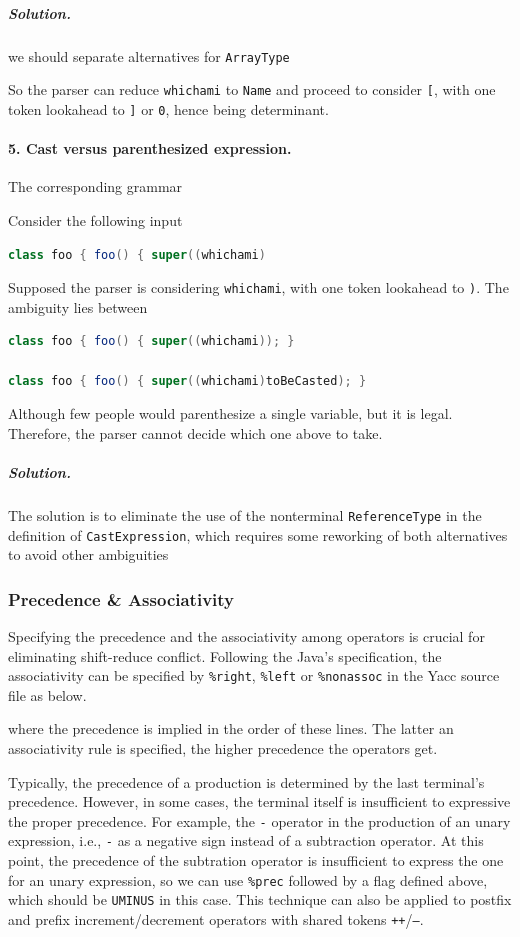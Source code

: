 \documentclass[12pt]{article}
\begin{document}
\subparagraph{Solution.} we should separate alternatives for \texttt{ArrayType}



So the parser can reduce \texttt{whichami} to \texttt{Name} and proceed to consider \texttt{[}, with one token lookahead to \texttt{]} or \texttt{0}, hence being determinant.

\paragraph{5. Cast versus parenthesized expression.}
The corresponding grammar

Consider the following input
\begin{lstlisting}[language=Java]
class foo { foo() { super((whichami)
\end{lstlisting}
Supposed the parser is considering \texttt{whichami}, with one token lookahead to \texttt{)}. The ambiguity lies between
\begin{lstlisting}[language=Java]
class foo { foo() { super((whichami)); }

class foo { foo() { super((whichami)toBeCasted); }
\end{lstlisting}
Although few people would parenthesize a single variable, but it is legal. Therefore, the parser cannot decide which one above to take.

\subparagraph{Solution.} The solution is to eliminate the use of the nonterminal \texttt{ReferenceType} in the definition of \texttt{CastExpression}, which requires some reworking of both alternatives to avoid other ambiguities


\subsubsection{Precedence \& Associativity}
Specifying the precedence and the associativity among operators is crucial for eliminating shift-reduce conflict. Following the Java's specification, the associativity can be specified by \texttt{\%right}, \texttt{\%left} or \texttt{\%nonassoc} in the Yacc source file as below.

where the precedence is implied in the order of these lines. The latter an associativity rule is specified, the higher precedence the operators get.

Typically, the precedence of a production is determined by the last terminal's precedence. However, in some cases, the terminal itself is insufficient to expressive the proper precedence. For example, the \texttt{-} operator in the production of an unary expression, i.e., \texttt{-} as a negative sign instead of a subtraction operator. At this point, the precedence of the subtration operator is insufficient to express the one for an unary expression, so we can use \texttt{\%prec} followed by a flag defined above, which should be \texttt{UMINUS} in this case. This technique can also be applied to postfix and prefix increment/decrement operators with shared tokens \texttt{++}/\texttt{--}.

\end{document}
